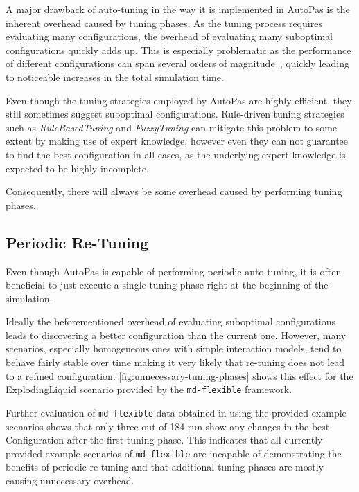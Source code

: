 \documentclass[conference]{IEEEtran}
\begin{document}
A major drawback of auto-tuning in the way it is implemented in AutoPas is the inherent overhead caused by tuning phases. As the tuning process requires evaluating many configurations, the overhead of evaluating many suboptimal configurations quickly adds up. This is especially problematic as the performance of different configurations can span several orders of magnitude~\cite{endreport.pdf}\cite{Manuel_Lerchner_Thesis.pdf}, quickly leading to noticeable increases in the total simulation time.

Even though the tuning strategies employed by AutoPas are highly efficient, they still sometimes suggest suboptimal configurations. Rule-driven tuning strategies such as \textit{RuleBasedTuning} and \textit{FuzzyTuning} can mitigate this problem to some extent by making use of expert knowledge, however even they can not guarantee to find the best configuration in all cases, as the underlying expert knowledge is expected to be highly incomplete.

Consequently, there will always be some overhead caused by performing tuning phases.

\subsection*{Periodic Re-Tuning}

Even though AutoPas is capable of performing periodic auto-tuning, it is often beneficial to just execute a single tuning phase right at the beginning of the simulation.

Ideally the beforementioned overhead of evaluating suboptimal configurations leads to discovering a better configuration than the current one. However, many scenarios, especially homogeneous ones with simple interaction models, tend to behave fairly stable over time making it very likely that re-tuning does not lead to a refined configuration. \autoref{fig:unnecessary-tuning-phases} shows this effect for the ExplodingLiquid scenario provided by the \texttt{md-flexible} framework.

Further evaluation of \texttt{md-flexible} data obtained in \cite{lerchner2024} using the provided example scenarios shows that only three out of 184 run show any changes in the best Configuration after the first tuning phase. This indicates that all currently provided example scenarios of \texttt{md-flexible} are incapable of demonstrating the benefits of periodic re-tuning and that additional tuning phases are mostly causing unnecessary overhead.
\end{document}
